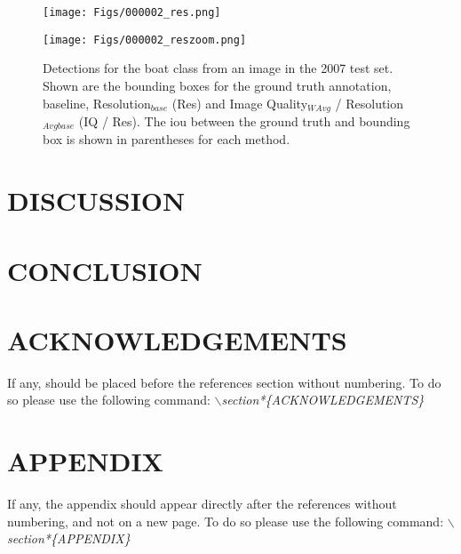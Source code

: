 \documentclass[a4paper,twoside]{article}
\begin{document}
 
 \begin{figure*}[!h]
  \texttt{[image: Figs/000002\_res.png]}
  \caption*{}\label{fig:}
\endminipage\hfill
{}
  \texttt{[image: Figs/000002\_reszoom.png]}
  \caption*{}\label{fig:}
\endminipage\hfill
\caption{Detections for the boat class from an image in the 2007 test set. Shown are the bounding boxes for the ground truth annotation, baseline, Resolution$_{base}$ (Res) and Image Quality$_{WAvg}$ / Resolution$_{Avgbase}$ (IQ / Res). The \gls{iou} between the ground truth and bounding box is shown in parentheses for each method.}
\label{fig:boatres}
\end{figure*}





\section{\uppercase{Discussion}}

\section{\uppercase{Conclusion}}

\section*{\uppercase{Acknowledgements}}

\noindent If any, should be placed before the references section
without numbering. To do so please use the following command:
\textit{$\backslash$section*\{ACKNOWLEDGEMENTS\}}


\vfill

{\small
}


\section*{\uppercase{Appendix}}

\noindent If any, the appendix should appear directly after the
references without numbering, and not on a new page. To do so please use the following command:
\textit{$\backslash$section*\{APPENDIX\}}

\vfill
\end{document}
